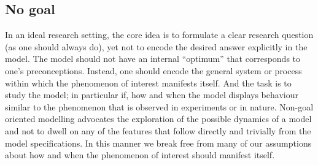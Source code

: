 \subsection{No goal}

In an ideal research setting, the core idea is to formulate a clear research question (as one should always do), yet not to encode the desired answer explicitly in the model. The model should not have an internal “optimum” that corresponds to one’s preconceptions. Instead, one should encode the general system or process within which the phenomenon of interest manifests itself. And the task is to study the model; in particular if, how and when the model displays behaviour similar to the phenomenon that is observed in experiments or in nature. Non-goal oriented modelling advocates the exploration of the possible dynamics of a model and not to dwell on any of the features that follow directly and trivially from the model specifications. In this manner we break free from many of our assumptions about how and when the phenomenon of interest should manifest itself.
  